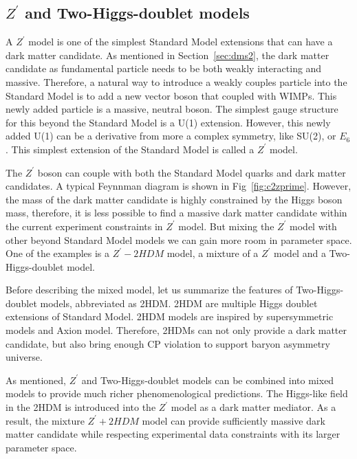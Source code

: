 \subsection{$Z^{\prime}$ and Two-Higgs-doublet models}
\par A $Z^{\prime}$ model\cite{He:1991qd} is one of the simplest Standard Model extensions that can have a dark matter candidate. As mentioned in Section~\ref{sec:dms2}, the dark matter candidate as fundamental particle needs to be both weakly interacting and massive. Therefore, a natural way to introduce a weakly couples particle into the Standard Model is to add a new vector boson that coupled with WIMPs. This newly added particle is a massive, neutral boson. The simplest gauge structure for this beyond the Standard Model is a U(1) extension. However, this newly added U(1) can be a derivative from more a complex symmetry, like SU(2), or $E_{6}$. This simplest extension of the Standard Model is called a $Z^{\prime}$ model.

\par The $Z^\prime$ boson can couple with both the Standard Model quarks and dark matter candidates. A typical Feynnman diagram is shown in Fig~\ref{fig:c2zprime}. However, the mass of the dark matter candidate is highly constrained by the Higgs boson mass, therefore, it is less possible to find a massive dark matter candidate within the current experiment constraints in $Z^{\prime}$ model. But mixing the $Z^{\prime}$ model with other beyond Standard Model models we can gain more room in parameter space. One of the examples is a $Z^{\prime}-2HDM$ model, a mixture of a $Z^{\prime}$ model and a Two-Higgs-doublet model.

\par Before describing the mixed model, let us summarize the features of Two-Higgs-doublet models\cite{Branco:2011iw}, abbreviated as 2HDM. 2HDM are multiple Higgs doublet extensions of Standard Model. 2HDM models are inspired by supersymmetric models\cite{Martin:1997ns} and Axion model\cite{Peccei:2006as}. Therefore, 2HDMs can not only provide a dark matter candidate, but also bring enough CP violation to support baryon asymmetry universe.


\par As mentioned, $Z^{\prime}$ and Two-Higgs-doublet models can be combined into mixed models to provide much richer phenomenological predictions. The Higgs-like field in the 2HDM is introduced into the $Z^{\prime}$ model as a dark matter mediator. As a result, the mixture $Z^{\prime}+2HDM$ model\cite{Berlin:2014cfa} can provide sufficiently massive dark matter candidate while respecting experimental data constraints with its larger parameter space.

